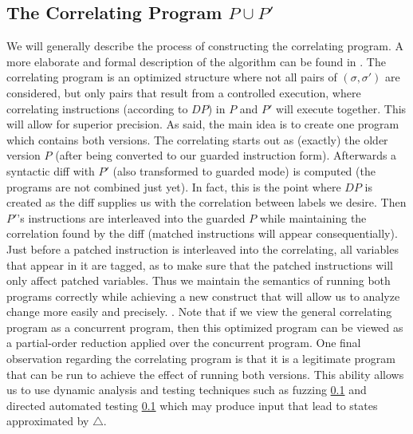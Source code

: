 \subsection{The Correlating Program $P \cup P'$ }
We will generally describe the process of constructing the correlating program. A more elaborate and formal description of the algorithm can be found in . The correlating program is an optimized structure where not all pairs of $(\sigma,\sigma')$ are considered, but only pairs that result from a controlled execution, where correlating instructions (according to $DP$) in $P$ and $P'$ will execute together. This will allow for superior precision. As said, the main idea is to create one program which contains both versions. The correlating starts out as (exactly) the older version $P$ (after being converted to our guarded instruction form). Afterwards a syntactic diff with $P'$ (also transformed to guarded mode) is computed (the programs are not combined just yet). In fact, this is the point where $DP$ is created as the diff supplies us with the correlation between labels we desire. Then $P'$'s instructions are interleaved into the guarded $P$ while maintaining the correlation found by the diff (matched instructions will appear consequentially). Just before a patched instruction is interleaved into the correlating, all variables that appear in it are tagged, as to make sure that the patched instructions will only affect patched variables. Thus we maintain the semantics of running both programs correctly while achieving a new construct that will allow us to analyze change more easily and precisely. . Note that if we view the general correlating program as a concurrent program, then this optimized program can be viewed as a partial-order reduction applied over the concurrent program. One final observation regarding the correlating program is that it is a legitimate program that can be run to achieve the effect of running both versions. This ability allows us to use dynamic analysis and testing techniques such as fuzzing \ref{} and directed automated testing \ref{} which may produce input that lead to states approximated by $\triangle$.

